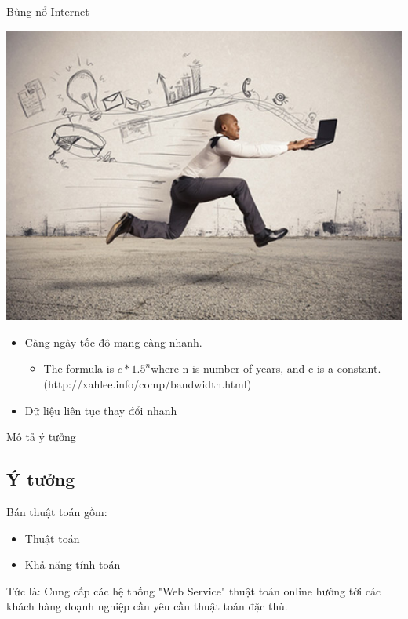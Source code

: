 \documentclass{beamer}
\begin{document}
\begin{frame}{Bùng nổ Internet}
\begin{center}
\includegraphics[scale=0.2]{internet.jpg}
\end{center}
\begin{itemize}
\item Càng ngày tốc độ mạng càng nhanh.
\begin{itemize}
\item The formula is $c*1.5^n $where n is number of years, and c is a constant.(http://xahlee.info/comp/bandwidth.html)
\end{itemize}
\item Dữ liệu liên tục thay đổi nhanh
\end{itemize}

\end{frame}
\begin{frame}{Mô tả ý tưởng}
\subsection{Ý tưởng}
Bán thuật toán gồm:
\begin{itemize}
\item Thuật toán 
\item Khả năng tính toán 
\end{itemize}
Tức là: Cung cấp các hệ thống {\color{hilight}"Web Service"} thuật toán online hướng tới các khách hàng doạnh nghiệp cần yêu cầu thuật toán đặc thù.
\end{frame}
\end{document}
